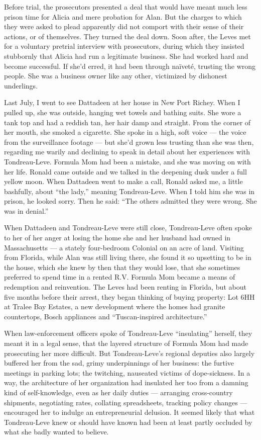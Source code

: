 Before trial, the prosecutors presented a deal that would have meant
much less prison time for Alicia and mere probation for Alan. But the
charges to which they were asked to plead apparently did not comport
with their sense of their actions, or of themselves. They turned the
deal down. Soon after, the Leves met for a voluntary pretrial interview
with prosecutors, during which they insisted stubbornly that Alicia had
run a legitimate business. She had worked hard and become successful. If
she'd erred, it had been through naïveté, trusting the wrong people. She
was a business owner like any other, victimized by dishonest underlings.

Last July, I went to see Dattadeen at her house in New Port Richey. When
I pulled up, she was outside, hanging wet towels and bathing suits. She
wore a tank top and had a reddish tan, her hair damp and straight. From
the corner of her mouth, she smoked a cigarette. She spoke in a high,
soft voice --- the voice from the surveillance footage --- but she'd
grown less trusting than she was then, regarding me warily and declining
to speak in detail about her experiences with Tondreau-Leve. Formula Mom
had been a mistake, and she was moving on with her life. Ronald came
outside and we talked in the deepening dusk under a full yellow moon.
When Dattadeen went to make a call, Ronald asked me, a little bashfully,
about ``the lady,'' meaning Tondreau-Leve. When I told him she was in
prison, he looked sorry. Then he said: ``The others admitted they were
wrong. She was in denial.''

When Dattadeen and Tondreau-Leve were still close, Tondreau-Leve often
spoke to her of her anger at losing the home she and her husband had
owned in Massachusetts --- a stately four-bedroom Colonial on an acre of
land. Visiting from Florida, while Alan was still living there, she
found it so upsetting to be in the house, which she knew by then that
they would lose, that she sometimes preferred to spend time in a rented
R.V. Formula Mom became a means of redemption and reinvention. The Leves
had been renting in Florida, but about five months before their arrest,
they began thinking of buying property: Lot 6HH at Tralee Bay Estates, a
new development where the homes had granite countertops, Bosch
appliances and ``Tuscan-inspired architecture.''

When law-enforcement officers spoke of Tondreau-Leve ``insulating''
herself, they meant it in a legal sense, that the layered structure of
Formula Mom had made prosecuting her more difficult. But Tondreau-Leve's
regional deputies also largely buffered her from the sad, grimy
underpinnings of her business: the furtive meetings in parking lots; the
twitching, nauseated victims of dope-sickness. In a way, the
architecture of her organization had insulated her too from a damning
kind of self-knowledge, even as her daily duties --- arranging
cross-country shipments, negotiating rates, collating spreadsheets,
tracking policy changes --- encouraged her to indulge an entrepreneurial
delusion. It seemed likely that what Tondreau-Leve knew or should have
known had been at least partly occluded by what she badly wanted to
believe.

